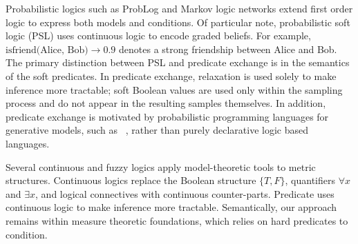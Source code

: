 Probabilistic logics such as ProbLog \cite{richardson2006markov} and Markov logic networks \cite{de2007problog} extend first order logic to express both models and conditions.
Of particular note, probabilistic soft logic (PSL) \cite{brocheler2012probabilistic,kimmig2012short} uses continuous logic to encode graded beliefs.
For example, $\text{isfriend(Alice, Bob)} \to 0.9$ denotes a strong friendship between Alice and Bob.
The primary distinction between PSL and predicate exchange is in the semantics of the soft predicates.
In predicate exchange, relaxation is used solely to make inference more tractable; soft Boolean values are used only within the sampling process and do not appear in the resulting samples themselves.
In addition, predicate exchange is motivated by probabilistic programming languages for generative models, such as ~\citep{milch20071, wood2014new,mansinghka2014venture,goodman2008church}, rather than purely declarative logic based languages.


Several continuous \cite{levin2000continuous} and fuzzy \cite{klir1995fuzzy} logics apply model-theoretic tools to metric structures.
Continuous logics replace the Boolean structure $\{T, F\}$, quantifiers $\forall x$ and $\exists x$, and logical connectives with continuous counter-parts.
Predicate uses continuous logic to make inference more tractable. Semantically, our approach remains within measure theoretic foundations, which relies on hard predicates to condition.



